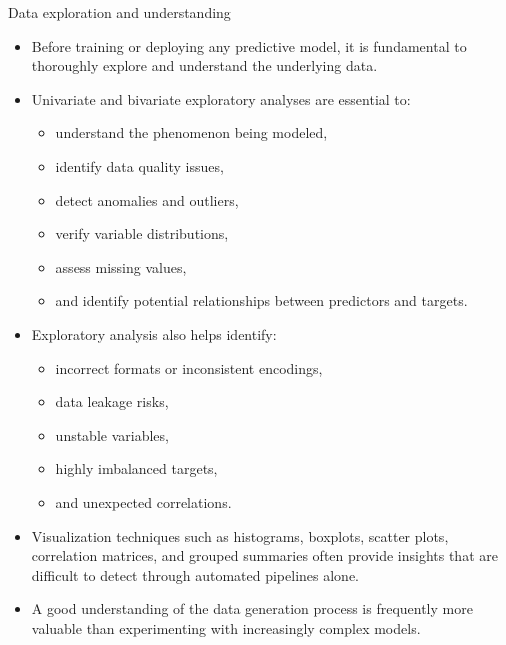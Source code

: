 \documentclass[
  ignorenonframetext,
]{beamer}
\providecommand{\tightlist}{%
  \setlength{\itemsep}{0pt}\setlength{\parskip}{0pt}}
\begin{document}
\begin{frame}
\begin{block}{Data exploration and understanding}
\label{data-exploration-and-understanding}
\begin{itemize}
\tightlist
\item
  Before training or deploying any predictive model, it is fundamental
  to thoroughly explore and understand the underlying data.
\item
  Univariate and bivariate exploratory analyses are essential to:

  \begin{itemize}
  \tightlist
  \item
    understand the phenomenon being modeled,
  \item
    identify data quality issues,
  \item
    detect anomalies and outliers,
  \item
    verify variable distributions,
  \item
    assess missing values,
  \item
    and identify potential relationships between predictors and targets.
  \end{itemize}
\item
  Exploratory analysis also helps identify:

  \begin{itemize}
  \item
    incorrect formats or inconsistent encodings,
  \item
    data leakage risks,
  \item
    unstable variables,
  \item
    highly imbalanced targets,
  \item
    and unexpected correlations.
  \end{itemize}
\end{itemize}
\end{block}
\end{frame}

\begin{frame}
\begin{itemize}
\tightlist
\item
  Visualization techniques such as histograms, boxplots, scatter plots,
  correlation matrices, and grouped summaries often provide insights
  that are difficult to detect through automated pipelines alone.
\item
  A good understanding of the data generation process is frequently more
  valuable than experimenting with increasingly complex models.
\end{itemize}
\end{frame}
\end{document}
